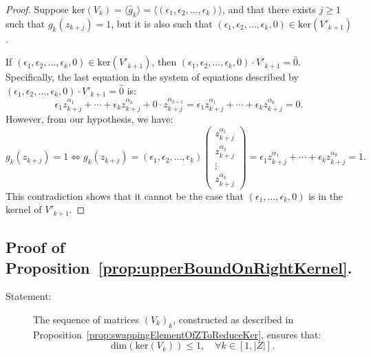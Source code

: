 \documentclass[11pt]{llncs}
\begin{document}
\begin{proof}
	
	    Suppose \( \text{ker}(V_k) = \langle \hat{g}_k \rangle = \langle (\epsilon_1, \epsilon_2, \dots, \epsilon_k) \rangle \), and that there exists \( j \geq 1 \) such that \( g_k(z_{k+j}) = 1 \), but it is also such that \( (\epsilon_1, \epsilon_2, \dots, \epsilon_k, 0) \in \text{ker}(V'_{k+1}) \).

  
If \( (\epsilon_1, \epsilon_2, \dots, \epsilon_k, 0) \in \text{ker}(V'_{k+1}) \), then \( (\epsilon_1, \epsilon_2, \dots, \epsilon_k, 0) \cdot V'_{k+1} = \hat{0} \). Specifically, the last equation in the system of equations described by \( (\epsilon_1, \epsilon_2, \dots, \epsilon_k, 0) \cdot V'_{k+1} = \hat{0} \) is:
   \[
\epsilon_1 z_{k+j}^{\alpha_1} + \cdots + \epsilon_k z_{k+j}^{\alpha_k} + 0 \cdot z_{k+j}^{\alpha_{k+1}} = \epsilon_1 z_{k+j}^{\alpha_1} + \cdots + \epsilon_k z_{k+j}^{\alpha_k} = 0.
\]
However, from our hypothesis, we have:
\[
g_k(z_{k+j}) = 1 \iff g_k(z_{k+j}) = 
(\epsilon_1, \epsilon_2, \dots, \epsilon_k)
\begin{pmatrix}
z_{k+j}^{\alpha_1} \\
z_{k+j}^{\alpha_2} \\
\vdots \\
z_{k+j}^{\alpha_k}
\end{pmatrix}
= \epsilon_1 z_{k+j}^{\alpha_1} + \cdots + \epsilon_k z_{k+j}^{\alpha_k} = 1.
\]
This contradiction shows that it cannot be the case that \( (\epsilon_1, \dots, \epsilon_k, 0) \) is in the kernel of \( V'_{k+1} \).   

\end{proof}

\subsection{Proof of Proposition~\ref{prop:upperBoundOnRightKernel}.}
\begin{description}
    \item[Statement:] The sequence of matrices \( (V_k)_k \), constructed as described in Proposition~\ref{prop:swappingElementOfZToReduceKer}, ensures that:    
    \[
    \text{dim}\left(\text{ker}\left(V_k\right)\right) \leq 1, \quad \forall k \in [1, |Z|].
    \]
\end{description}
\end{document}
